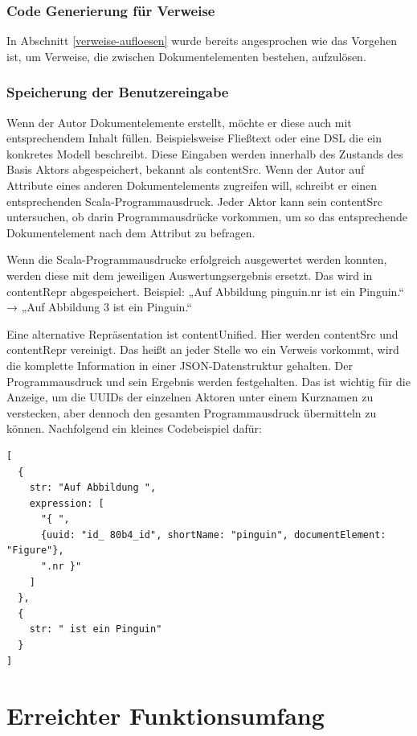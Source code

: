  
\subsubsection{Code Generierung für Verweise}\label{}

 
In Abschnitt \ref{verweise-aufloesen} wurde bereits angesprochen wie das Vorgehen ist, um Verweise, die zwischen Dokumentelementen bestehen, aufzulösen.

 
\subsubsection{Speicherung der Benutzereingabe}\label{contentSrc}

 
Wenn der Autor Dokumentelemente erstellt, möchte er diese auch mit entsprechendem Inhalt füllen. Beispielsweise Fließtext oder eine DSL die ein konkretes Modell beschreibt. Diese Eingaben werden innerhalb des Zustands des Basis Aktors abgespeichert, bekannt als contentSrc. Wenn der Autor auf Attribute eines anderen Dokumentelements zugreifen will, schreibt er einen entsprechenden Scala-Programmausdruck. Jeder Aktor kann sein contentSrc untersuchen, ob darin Programmausdrücke vorkommen, um so das entsprechende Dokumentelement nach dem Attribut zu befragen.

 
Wenn die Scala-Programmausdrucke erfolgreich ausgewertet werden konnten, werden diese mit dem jeweiligen Auswertungsergebnis ersetzt. Das wird in contentRepr abgespeichert. Beispiel: „Auf Abbildung { pinguin.nr } ist ein Pinguin.“ → „Auf Abbildung 3 ist ein Pinguin.“

 
Eine alternative Repräsentation ist contentUnified. Hier werden contentSrc und contentRepr vereinigt. Das heißt an jeder Stelle wo ein Verweis vorkommt, wird die komplette Information in einer JSON-Datenstruktur gehalten. Der Programmausdruck und sein Ergebnis werden festgehalten. Das ist wichtig für die Anzeige, um die UUIDs der einzelnen Aktoren unter einem Kurznamen zu verstecken, aber dennoch den gesamten Programmausdruck übermitteln zu können. Nachfolgend ein kleines Codebeispiel dafür:

 
\begin{verbatim}
[
  {
    str: "Auf Abbildung ",
    expression: [
      "{ ",
      {uuid: "id_ 80b4_id", shortName: "pinguin", documentElement: "Figure"},
      ".nr }"
    ]
  },
  {
    str: " ist ein Pinguin"
  }
]
\end{verbatim}
 
\section{Erreichter Funktionsumfang}\label{}
 
